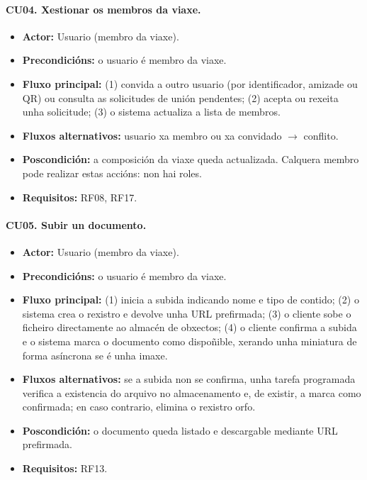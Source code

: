 \paragraph*{CU04. Xestionar os membros da viaxe.}
\begin{itemize}[noitemsep,topsep=2pt]
  \item \textbf{Actor:} Usuario (membro da viaxe).
  \item \textbf{Precondicións:} o usuario é membro da viaxe.
  \item \textbf{Fluxo principal:} (1) convida a outro usuario (por identificador, amizade ou QR) ou consulta as solicitudes de unión pendentes; (2) acepta ou rexeita unha solicitude; (3) o sistema actualiza a lista de membros.
  \item \textbf{Fluxos alternativos:} usuario xa membro ou xa convidado $\rightarrow$ conflito.
  \item \textbf{Poscondición:} a composición da viaxe queda actualizada. Calquera membro pode realizar estas accións: non hai roles.
  \item \textbf{Requisitos:} RF08, RF17.
\end{itemize}

\paragraph*{CU05. Subir un documento.}
\begin{itemize}[noitemsep,topsep=2pt]
  \item \textbf{Actor:} Usuario (membro da viaxe).
  \item \textbf{Precondicións:} o usuario é membro da viaxe.
  \item \textbf{Fluxo principal:} (1) inicia a subida indicando nome e tipo de contido; (2) o sistema crea o rexistro e devolve unha URL prefirmada; (3) o cliente sobe o ficheiro directamente ao almacén de obxectos; (4) o cliente confirma a subida e o sistema marca o documento como dispoñible, xerando unha miniatura de forma asíncrona se é unha imaxe.
  \item \textbf{Fluxos alternativos:} se a subida non se confirma, unha tarefa programada verifica a existencia do arquivo no almacenamento e, de existir, a marca como confirmada; en caso contrario, elimina o rexistro orfo.
  \item \textbf{Poscondición:} o documento queda listado e descargable mediante URL prefirmada.
  \item \textbf{Requisitos:} RF13.
\end{itemize}

